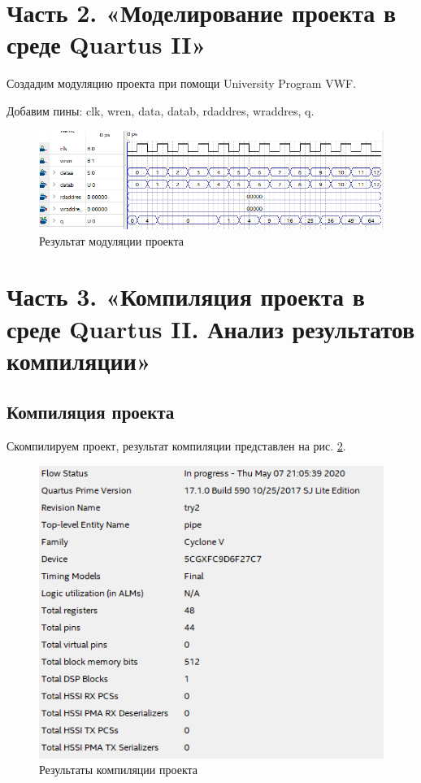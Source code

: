 \documentclass[a4paper,14pt]{article}
\begin{document}
\section{Часть 2. «Моделирование проекта в среде Quartus II»}

Создадим модуляцию проекта при помощи University Program VWF. 

Добавим пины: clk, wren, data, datab, rdaddres, wraddres, q.

\begin{figure}[H]
	\centering
	\includegraphics[width=0.9\linewidth]{image/lab5/screenshot013}
	\caption{Результат модуляции проекта}
	\label{fig:screenshot013}
\end{figure}

\section{Часть 3. «Компиляция проекта в среде Quartus II. Анализ результатов компиляции»}

\subsection{Компиляция проекта}

Скомпилируем проект, результат компиляции  представлен на рис. \ref{fig:screenshot014}.

\begin{figure}[H]
	\centering
	\includegraphics[width=0.7\linewidth]{image/lab5/screenshot014}
	\caption{Результаты компиляции проекта}
	\label{fig:screenshot014}
\end{figure}
\end{document}
